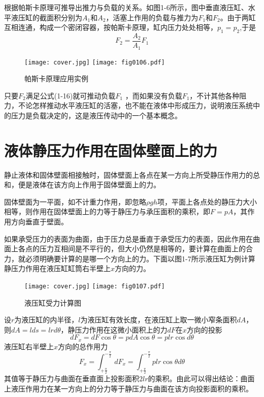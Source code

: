 根据帕斯卡原理可推导出推力与负载的关系。如图1-6所示，图中垂直液压缸、水平液压缸的截面积分别为$A_1$和$A_2$，活塞上作用的负载与推力为$F_1$和$F_2$。由于两缸互相连通，构成一个密闭容器，按帕斯卡原理，缸内压力处处相等，$p_1=p_2$,于是
\begin{equation}
F_2=\frac{A_2}{A_1}F_1
\end{equation}

\begin{figure}[!hbt]
    \centering
    \ifOpenSource
    \texttt{[image: cover.jpg]}
    \else
    \texttt{[image: fig0106.pdf]}
    \fi
    \caption{帕斯卡原理应用实例}
    \label{fig:fig0106}
    \end{figure}

只要$F_2$满足公式(1-16)就可推动负载$F_1$ ，而如果没有负载$F_1$，不计其他各种阻力，不论怎样推动水平液压缸的活塞，也不能在液体中形成压力，说明液压系统中的压力是负载决定的，这是液压传动中的一个基本概念。

\section{液体静压力作用在固体壁面上的力}
静止液体和固体壁面相接触时，固体壁面上各点在某一方向上所受静压作用力的总和，便是液体在该方向上作用于固体壁面上的力。

固体壁面为一平面，如不计重力作用，即忽略$\rho gh$项，平面上各点处的静压力大小相等，则作用在固体壁面上的力等于静压力与承压面积的乘积，即$F=pA$，其作用方向垂直于壁面。

如果承受压力的表面为曲面，由于压力总是垂直于承受压力的表面，因此作用在曲面上各点的压力互相间是不平行的，但大小仍然是相等的，要计算在曲面上的合力，就必须明确要计算的是哪一个方向上的力。下面以图1-7所示液压缸为例计算静压力作用在液压缸缸筒右半壁上$x$方向的力。

\begin{figure}[!hbt]
    \centering
    \ifOpenSource
    \texttt{[image: cover.jpg]}
    \else
    \texttt{[image: fig0107.pdf]}
    \fi
    \caption{液压缸受力计算图}
    \label{fig:fig0107}
    \end{figure}

设$r$为液压缸的内半径，$l$为液压缸有效长度，在液压缸上取一微小窄条面积$dA$，则$dA=lds=lrd\theta$，静压力作用在这微小面积上的力$dF$在$x$方向的投影
$$dF_x=dF\cos \theta=pdA\cos \theta=plr\cos d\theta$$
液压缸右半壁上$x$方向的总作用力
$$F_x=\int_{+\frac{\pi}{2}}^{-\frac{\pi}{2}}  \,dF_x=\int_{+\frac{\pi}{2}}^{-\frac{\pi}{2}}  plr\cos \theta d\theta$$
其值等于静压力与曲面在垂直面上投影面积$2lr$的乘积。由此可以得出结论：曲面上液压作用力在某一方向上的分力等于静压力与曲面在该方向投影面积的乘积。


